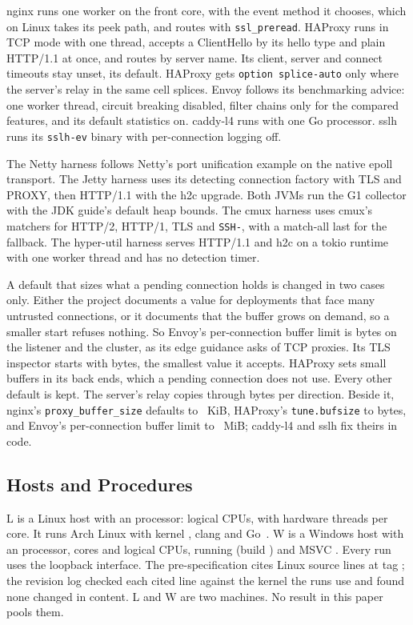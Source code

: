  nginx runs one worker on the front core, with the event method it chooses, which
on Linux takes its peek path, and routes with \texttt{ssl\_preread}. HAProxy runs in TCP mode with
one thread, accepts a ClientHello by its hello type and plain HTTP/1.1 at once, and routes by
server name. Its client, server and connect timeouts stay unset, its default. HAProxy gets
\texttt{option splice-auto} only where the server's relay in the same cell splices. Envoy follows
its benchmarking advice: one worker thread, circuit breaking disabled, filter chains only for the
compared features, and its default statistics on. caddy-l4 runs with one Go processor. sslh runs
its \texttt{sslh-ev} binary with per-connection logging off.

 The Netty harness follows Netty's port unification example on the native epoll
transport. The Jetty harness uses its detecting connection factory with TLS and PROXY, then
HTTP/1.1 with the h2c upgrade. Both JVMs run the G1 collector with the JDK guide's default heap
bounds. The cmux harness uses cmux's matchers for HTTP/2, HTTP/1, TLS and \texttt{SSH-}, with a
match-all last for the fallback. The hyper-util harness serves HTTP/1.1 and h2c on a tokio runtime
with one worker thread and has no detection timer.

 A default that sizes what a pending connection holds is changed in two cases
only. Either the project documents a value for deployments that face many untrusted connections,
or it documents that the buffer grows on demand, so a smaller start refuses nothing. So Envoy's
per-connection buffer limit is \EnvoyConnLimit{} bytes on the listener and the cluster, as its edge
guidance asks of TCP proxies. Its TLS inspector starts with \EnvoyInitialRead{} bytes, the
smallest value it accepts. HAProxy sets small buffers in its back ends, which a
pending connection does not use. Every other default is kept. The server's relay copies through
\RelayBuf{} bytes per direction. Beside it, nginx's \texttt{proxy\_buffer\_size} defaults to
\NginxProxyBufferK~KiB, HAProxy's \texttt{tune.bufsize} to \HaproxyBufsize{} bytes, and Envoy's
per-connection buffer limit to \EnvoyBufferDefaultMiB~MiB; caddy-l4 and sslh fix theirs in code.

\subsection{Hosts and Procedures}\label{sec:hosts}

 L is a Linux host with an \HostLCpu{} processor: \HostLCpus{} logical CPUs, with
\HostLSmt{} hardware threads per core. It runs Arch Linux with kernel \KernelL, clang
\ClangVersion{} and Go~\GoVersion. W is a Windows host with an \HostWCpu{} processor, \HostWCores{}
cores and \HostWCpus{} logical CPUs, running \HostWOs{} (build \HostWBuild) and MSVC
\MsvcVersion. Every run uses the loopback interface. The pre-specification cites Linux source lines
at tag \KernelTag; the revision log checked each cited line against the kernel the runs use and
found none changed in content. L and W are two machines. No result in this paper pools them.

